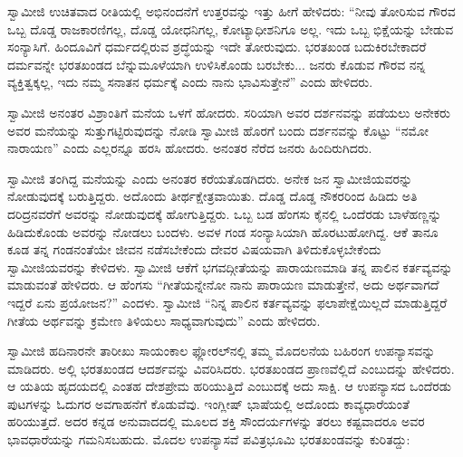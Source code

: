 ಸ್ವಾಮೀಜಿ ಉಚಿತವಾದ ರೀತಿಯಲ್ಲಿ ಅಭಿನಂದನೆಗೆ ಉತ್ತರವನ್ನು ಇತ್ತು ಹೀಗೆ ಹೇಳಿದರು: “ನೀವು ತೋರಿಸುವ ಗೌರವ ಒಬ್ಬ ದೊಡ್ಡ ರಾಜಕಾರಣಿಗಲ್ಲ, ದೊಡ್ಡ ಯೋಧನಿಗಲ್ಲ, ಕೋಟ್ಯಾಧೀಶನಿಗೂ ಅಲ್ಲ. ಇದು ಒಬ್ಬ ಭಿಕ್ಷೆಯನ್ನು ಬೇಡುವ ಸಂನ್ಯಾಸಿಗೆ. ಹಿಂದೂವಿಗೆ ಧರ್ಮದಲ್ಲಿರುವ ಶ್ರದ್ಧೆಯನ್ನು ಇದೇ ತೋರುವುದು. ಭರತಖಂಡ ಬದುಕಿರಬೇಕಾದರೆ ದರ್ಮವನ್ನೇ ಭರತಖಂಡದ ಬೆನ್ನುಮೂಳೆಯಾಗಿ ಉಳಿಸಿಕೊಂಡು ಬರಬೇಕು... ಜನರು ಕೊಡುವ ಗೌರವ ನನ್ನ ವ್ಯಕ್ತಿತ್ವಕ್ಕಲ್ಲ, ಇದು ನಮ್ಮ ಸನಾತನ ಧರ್ಮಕ್ಕೆ ಎಂದು ನಾನು ಭಾವಿಸುತ್ತೇನೆ” ಎಂದು ಹೇಳಿದರು. 

 ಸ್ವಾಮೀಜಿ ಅನಂತರ ವಿಶ್ರಾಂತಿಗೆ ಮನೆಯ ಒಳಗೆ ಹೋದರು. ಸರಿಯಾಗಿ ಅವರ ದರ್ಶನವನ್ನು ಪಡೆಯಲು ಅನೇಕರು ಅವರ ಮನೆಯನ್ನು ಸುತ್ತುಗಟ್ಟಿರುವುದನ್ನು ನೋಡಿ ಸ್ವಾಮೀಜಿ ಹೊರಗೆ ಬಂದು ದರ್ಶನವನ್ನು ಕೊಟ್ಟು “ನಮೋ ನಾರಾಯಣ” ಎಂದು ಎಲ್ಲರನ್ನೂ ಹರಸಿ ಹೋದರು. ಅನಂತರ ನೆರೆದ ಜನರು ಹಿಂದಿರುಗಿದರು. 

 ಸ್ವಾಮೀಜಿ ತಂಗಿದ್ದ ಮನೆಯನ್ನು  ಎಂದು ಅನಂತರ ಕರೆಯತೊಡಗಿದರು. ಅನೇಕ ಜನ ಸ್ವಾಮೀಜಿಯವರನ್ನು ನೋಡುವುದಕ್ಕೆ ಬರುತ್ತಿದ್ದರು. ಅದೊಂದು ತೀರ್ಥಕ್ಷೇತ್ರವಾಯಿತು. ದೊಡ್ಡ ದೊಡ್ಡ ನೌಕರರಿಂದ ಹಿಡಿದು ಅತಿ ದರಿದ್ರನವರೆಗೆ ಅವರನ್ನು ನೋಡುವುದಕ್ಕೆ ಹೋಗುತ್ತಿದ್ದರು. ಒಬ್ಬ ಬಡ ಹೆಂಗಸು ಕೈನಲ್ಲಿ ಒಂದೆರಡು ಬಾಳೆಹಣ್ಣನ್ನು ಹಿಡಿದುಕೊಂಡು ಅವರನ್ನು ನೋಡಲು ಬಂದಳು. ಅವಳ ಗಂಡ ಸಂನ್ಯಾಸಿಯಾಗಿ ಹೊರಟುಹೋಗಿದ್ದ. ಆಕೆ ತಾನೂ ಕೂಡ ತನ್ನ ಗಂಡನಂತೆಯೇ ಜೀವನ ನಡೆಸಬೇಕೆಂದು ದೇವರ ವಿಷಯವಾಗಿ ತಿಳಿದುಕೊಳ್ಳಬೇಕೆಂದು ಸ್ವಾಮೀಜಿಯವರನ್ನು ಕೇಳಿದಳು. ಸ್ವಾಮೀಜಿ ಆಕೆಗೆ ಭಗವದ್ಗೀತೆಯನ್ನು ಪಾರಾಯಣಮಾಡಿ ತನ್ನ ಪಾಲಿನ ಕರ್ತವ್ಯವನ್ನು ಮಾಡುವಂತೆ ಹೇಳಿದರು. ಆ ಹೆಂಗಸು “ಗೀತೆಯನ್ನೇನೋ ನಾನು ಪಾರಾಯಣ ಮಾಡುತ್ತೇನೆ, ಅದು ಅರ್ಥವಾಗದೆ ಇದ್ದರೆ ಏನು ಪ್ರಯೋಜನ?” ಎಂದಳು. ಸ್ವಾಮೀಜಿ “ನಿನ್ನ ಪಾಲಿನ ಕರ್ತವ್ಯವನ್ನು ಫಲಾಪೇಕ್ಷೆಯಿಲ್ಲದೆ ಮಾಡುತ್ತಿದ್ದರೆ ಗೀತೆಯ ಅರ್ಥವನ್ನು ಕ್ರಮೇಣ ತಿಳಿಯಲು ಸಾಧ್ಯವಾಗುವುದು” ಎಂದು ಹೇಳಿದರು. 

 ಸ್ವಾಮೀಜಿ ಹದಿನಾರನೇ ತಾರೀಖು ಸಾಯಂಕಾಲ ಫ್ಲೋರಲ್‍ನಲ್ಲಿ ತಮ್ಮ ಮೊದಲನೆಯ ಬಹಿರಂಗ ಉಪನ್ಯಾಸವನ್ನು ಮಾಡಿದರು. ಅಲ್ಲಿ ಭರತಖಂಡದ ಆದರ್ಶವನ್ನು ವಿವರಿಸಿದರು. ಭರತಖಂಡದ ಪ್ರಾಣವೆಲ್ಲಿದೆ ಎಂಬುದನ್ನು ಹೇಳಿದರು. ಆ ಯತಿಯ ಹೃದಯದಲ್ಲಿ ಎಂತಹ ದೇಶಪ್ರೇಮ ಹರಿಯುತ್ತಿದೆ ಎಂಬುದಕ್ಕೆ ಅದು ಸಾಕ್ಷಿ. ಆ ಉಪನ್ಯಾಸದ ಒಂದೆರಡು ಪುಟಗಳನ್ನು ಓದುಗರ ಅವಗಾಹನೆಗೆ ಕೊಡುವೆವು. ಇಂಗ್ಲೀಷ್ ಭಾಷೆಯಲ್ಲಿ ಅದೊಂದು ಕಾವ್ಯಧಾರೆಯಂತೆ ಹರಿಯುತ್ತದೆ. ಅದರ ಕನ್ನಡ ಅನುವಾದದಲ್ಲಿ ಮೂಲದ ಶಕ್ತಿ ಸೌಂದರ್ಯಗಳನ್ನು ತರಲು ಕಷ್ಟವಾದರೂ ಅವರ ಭಾವಧಾರೆಯನ್ನು ಗಮನಿಸಬಹುದು. ಮೊದಲ ಉಪನ್ಯಾಸವೆ ಪವಿತ್ರಭೂಮಿ ಭರತಖಂಡವನ್ನು ಕುರಿತದ್ದು: 

